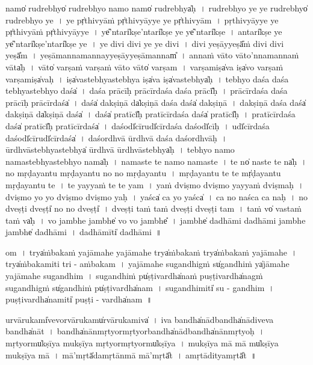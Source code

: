 \documentclass[parskip, DIV=14]{scrartcl}
\begin{document}
{namo̍ ru॒drebhyo̍ ru॒drebhyo॒ namo॒ namo̍ ru॒drebhya̍ḥ~।
ru॒drebhyo॒ ye ye ru॒drebhyo̍ ru॒drebhyo॒ ye~।
ye pṛ̍thi॒vyāṁ pṛ̍thi॒vyāyye ye pṛ̍thi॒vyām~।
pṛ॒thi॒vyāyye ye pṛ̍thi॒vyāṁ pṛ̍thi॒vyāyye~।
ye̎'ntari̍kṣe॒'ntari̍kṣe॒ ye ye̎'ntari̍kṣe~।
a॒ntari̍kṣe॒ ye ye̎'ntari̍kṣe॒'ntari̍kṣe॒ ye~।
ye di॒vi di॒vi ye ye di॒vi~।
di॒vi yeṣā॒yyeṣā̎ṁ di॒vi di॒vi yeṣā̎m~।
yeṣā॒manna॒manna॒yyeṣā॒yyeṣā॒mannam̎~।
anna॒ṁ vāto॒ vāto'nna॒manna॒ṁ vāta̍ḥ~।
vāto̍ va॒rṣaṁ va॒rṣaṁ vāto॒ vāto̍ va॒rṣam~।
va॒rṣamiṣa̍va॒ iṣa̍vo va॒rṣaṁ va॒rṣamiṣa̍vaḥ~।
iṣa̍va॒stebhya॒stebhya॒ iṣa̍va॒ iṣa̍va॒stebhya̍ḥ~।
tebhyo॒ daśa॒ daśa॒ tebhya॒stebhyo॒ daśa̍~।
daśa॒ prācī॒ḥ prācī॒rdaśa॒ daśa॒ prācī̎ḥ~।
prācī॒rdaśa॒ daśa॒ prācī॒ḥ prācī॒rdaśa̍~।
daśa̍ dakṣi॒ṇā da̍kṣi॒ṇā daśa॒ daśa̍ dakṣi॒ṇā~।
da॒kṣi॒ṇā daśa॒ daśa̍ dakṣi॒ṇā da̍kṣi॒ṇā daśa̍~।
daśa̍ pra॒tīcī̎ḥ pra॒tīcī॒rdaśa॒ daśa̍ pra॒tīcī̎ḥ~।
pra॒tīcī॒rdaśa॒ daśa̍ pra॒tīcī̎ḥ pra॒tīcī॒rdaśa̍~।
daśodī̍cī॒rudī̍cī॒rdaśa॒ daśodī̍cīḥ~।
udī̍cī॒rdaśa॒ daśodī̍cī॒rudī̍cī॒rdaśa̍~।
daśo॒rdhvā ū॒rdhvā daśa॒ daśo॒rdhvāḥ~।
ū॒rdhvāstebhya॒stebhya̍ ū॒rdhvā ū॒rdhvāstebhya̍ḥ~।
tebhyo॒ namo॒ nama॒stebhya॒stebhyo॒ nama̍ḥ~।
nama॒ste te namo॒ nama॒ste~।
te no̍ na॒ste te na̍ḥ~।
no॒ mṛ॒ḍa॒ya॒ntu॒ mṛ॒ḍa॒ya॒ntu॒ no॒ no॒ mṛ॒ḍa॒ya॒ntu॒~।
mṛ॒ḍa॒ya॒ntu॒ te te mṛ̍ḍayantu mṛḍayantu॒ te~।
te yayyaṁ te te yam~।
yaṁ dvi॒ṣmo dvi॒ṣmo yayyaṁ dvi॒ṣmaḥ~।
dvi॒ṣmo yo yo dvi॒ṣmo dvi॒ṣmo yaḥ~।
yaśca̍ ca॒ yo  yaśca̍~।
ca॒ no॒ na॒śca॒ ca॒ na॒ḥ॒~।
no॒ dveṣṭi॒ dveṣṭi̍ no no॒ dveṣṭi̍~।
dveṣṭi॒ taṁ taṁ dveṣṭi॒ dveṣṭi॒ tam~।
taṁ vo̍ va॒staṁ taṁ va̍ḥ~।
vo॒ jambhe॒ jambhe̍ vo vo॒ jambhe̎~।
jambhe̍ dadhāmi dadhāmi॒ jambhe॒ jambhe̍ dadhāmi~।
da॒dhā॒mīti̍ dadhāmi~॥

\vspace{1cm}

om~।
trya̍ṁbakaṁ yajāmahe yajāmahe॒ trya̍ṁbaka॒ṁ
trya̍ṁbakaṁ yajāmahe~।
trya̍ṁbaka॒miti॒ tri - a॒ṁba॒ka॒m~।
ya॒jā॒ma॒he॒ su॒ga॒ndhigṁ su̍ga॒ndhiṁ ya̍jāmahe yajāmahe
suga॒ndhim~।
su॒ga॒ndhiṁ pu̍ṣṭi॒vardha̍naṁ puṣṭi॒vardha̍nagṁ
suga॒ndhigṁ su̍ga॒ndhiṁ pu̍ṣṭi॒vardha̍nam~।
su॒ga॒ndhimiti̍ su - ga॒ndhim~।
pu॒ṣṭi॒vardha̍na॒miti̍ puṣṭi - vardha̍nam~॥ 

u॒rvā॒ru॒kami̍vevorvāru॒kamu̍rvāru॒kamiva̍~।
i॒va॒ bandha̍nā॒dbandha̍nādiveva॒ bandha̍nāt~। bandha̍nānmṛ॒tyormṛ॒tyorbandha̍nā॒dbandha̍nānmṛ॒tyoḥ~। mṛ॒tyormu̍kṣīya mukṣīya mṛ॒tyormṛ॒tyormu̍kṣīya~।
mu॒kṣī॒ya॒ mā mā mu̍kṣīya mukṣīya॒ mā~। mā'mṛtā̍da॒mṛtā॒nmā mā'mṛtā̎t~।
a॒mṛtā॒ditya॒mṛtā̎t~॥

}
\end{document}
